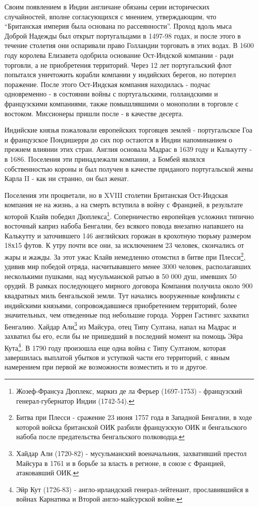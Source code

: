\documentclass[
  oneside,
  12pt,
  titlepage]{book}
\begin{document}
Своим появлением в Индии англичане обязаны серии исторических случайностей, вполне согласующихся с мнением, утверждающим, что ``Британская империя была основана по рассеянности''. Проход вдоль мыса Доброй Надежды был открыт португальцами в 1497-98 годах, и после этого в течение столетия они оспаривали право Голландии торговать в этих водах. В 1600 году королева Елизавета одобрила основание Ост-Индской компании - ради торговли, а не приобретения территорий. Через 12 лет португальский флот попытался уничтожить корабли компании у индийских берегов, но потерпел поражение. После этого Ост-Индская компания находилась - подчас одновременно - в состоянии войны с португальскими, голландскими и французскими компаниями, также помышлявшими о монополии в торговле с востоком. Миссионеры пришли после - в качестве десерта.

Индийские князья пожаловали европейских торговцев землей - португальское Гоа и французское Пондишерри до сих пор остаются в Индии напоминанием о прежнем влиянии этих стран. Англия основала Мадрас в 1639 году и Калькутту - в 1686. Поселения эти принадлежали компании, а Бомбей являлся собственностью короны и был получен в качестве приданого португальской жены Карла II - как ни странно, он был женат.

Поселения эти процветали, но в XVIII столетии Британская Ост-Индская компания не на жизнь, а на смерть вступила в войну с Францией, в результате которой Клайв победил Дюплекса\footnote{Жозеф-Франсуа Дюплекс, маркиз де ла Ферьер (1697-1753) - французский генерал-губернатор Индии (1742-54).}. Соперничество европейцев усложнил типично восточный каприз набоба Бенгалии, без всякого повода внезапно напавшего на Калькутту и заточившего 146 английских горожан в крохотную тюрьму размером 18х15 футов. К утру почти все они, за исключением 23 человек, скончались от жары и жажды. За этот ужас Клайв немедленно отомстил в битве при Плесси\footnote{Битва при Плесси - сражение 23 июня 1757 года в Западной Бенгалии, в ходе которой войска британской ОИК разбили французскую ОИК и бенгальского набоба после предательства бенгальского полководца.}, удивив мир победой отряда, насчитывавшего менее 3000 человек, располагавших несколькими пушками, над мусульманской ратью в 50 000 душ, имевших 50 орудий. В рамках последующего мирного договора Компания получила около 900 квадратных миль бенгальской земли. Тут начались вооруженные конфликты с индийскими князьями, сопровождавшиеся приобретением территорий, более значительных, чем отведенные под небольшие города. Уоррен Гастингс захватил Бенгалию. Хайдар Али\footnote{Хайдар Али (1720-82) - мусульманский военачальник, захвативший престол Майсура в 1761 и в борьбе за власть в регионе, в союзе с Францией, атаковавший ОИК.} из Майсура, отец Типу Султана, напал на Мадрас и захватил бы его, если бы не пришедший в последний момент на помощь Эйра Кута\footnote{Эйр Кут (1726-83) - англо-ирландский генерал-лейтенант, прославившийся в войнах Карнатика и Второй англо-майсурской войне.}. В 1790 году произошла еще одна война с Типу Султаном, которая завершилась выплатой убытков и уступкой части его территорий, с явным намерением при первой же возможности возместить и то и другое.
\end{document}
